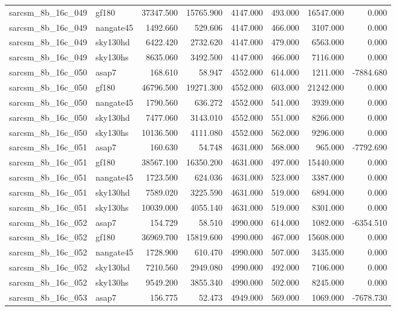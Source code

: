 \begin{tabular}{llrrrrrr}
sarcsm\_8b\_16c\_049 & gf180 & 37347.500 & 15765.900 & 4147.000 & 493.000 & 16547.000 & 0.000 \\
sarcsm\_8b\_16c\_049 & nangate45 & 1492.660 & 529.606 & 4147.000 & 466.000 & 3107.000 & 0.000 \\
sarcsm\_8b\_16c\_049 & sky130hd & 6422.420 & 2732.620 & 4147.000 & 479.000 & 6563.000 & 0.000 \\
sarcsm\_8b\_16c\_049 & sky130hs & 8635.060 & 3492.500 & 4147.000 & 466.000 & 7116.000 & 0.000 \\
sarcsm\_8b\_16c\_050 & asap7 & 168.610 & 58.947 & 4552.000 & 614.000 & 1211.000 & -7884.680 \\
sarcsm\_8b\_16c\_050 & gf180 & 46796.500 & 19271.300 & 4552.000 & 603.000 & 21242.000 & 0.000 \\
sarcsm\_8b\_16c\_050 & nangate45 & 1790.560 & 636.272 & 4552.000 & 541.000 & 3939.000 & 0.000 \\
sarcsm\_8b\_16c\_050 & sky130hd & 7477.060 & 3143.010 & 4552.000 & 551.000 & 8266.000 & 0.000 \\
sarcsm\_8b\_16c\_050 & sky130hs & 10136.500 & 4111.080 & 4552.000 & 562.000 & 9296.000 & 0.000 \\
sarcsm\_8b\_16c\_051 & asap7 & 160.630 & 54.748 & 4631.000 & 568.000 & 965.000 & -7792.690 \\
sarcsm\_8b\_16c\_051 & gf180 & 38567.100 & 16350.200 & 4631.000 & 497.000 & 15440.000 & 0.000 \\
sarcsm\_8b\_16c\_051 & nangate45 & 1723.500 & 624.036 & 4631.000 & 523.000 & 3387.000 & 0.000 \\
sarcsm\_8b\_16c\_051 & sky130hd & 7589.020 & 3225.590 & 4631.000 & 519.000 & 6894.000 & 0.000 \\
sarcsm\_8b\_16c\_051 & sky130hs & 10039.000 & 4055.140 & 4631.000 & 519.000 & 8301.000 & 0.000 \\
sarcsm\_8b\_16c\_052 & asap7 & 154.729 & 58.510 & 4990.000 & 614.000 & 1082.000 & -6354.510 \\
sarcsm\_8b\_16c\_052 & gf180 & 36969.700 & 15819.600 & 4990.000 & 467.000 & 15608.000 & 0.000 \\
sarcsm\_8b\_16c\_052 & nangate45 & 1728.900 & 610.470 & 4990.000 & 507.000 & 3435.000 & 0.000 \\
sarcsm\_8b\_16c\_052 & sky130hd & 7210.560 & 2949.080 & 4990.000 & 492.000 & 7106.000 & 0.000 \\
sarcsm\_8b\_16c\_052 & sky130hs & 9549.200 & 3855.340 & 4990.000 & 502.000 & 8245.000 & 0.000 \\
sarcsm\_8b\_16c\_053 & asap7 & 156.775 & 52.473 & 4949.000 & 569.000 & 1069.000 & -7678.730 \\

\end{tabular}
